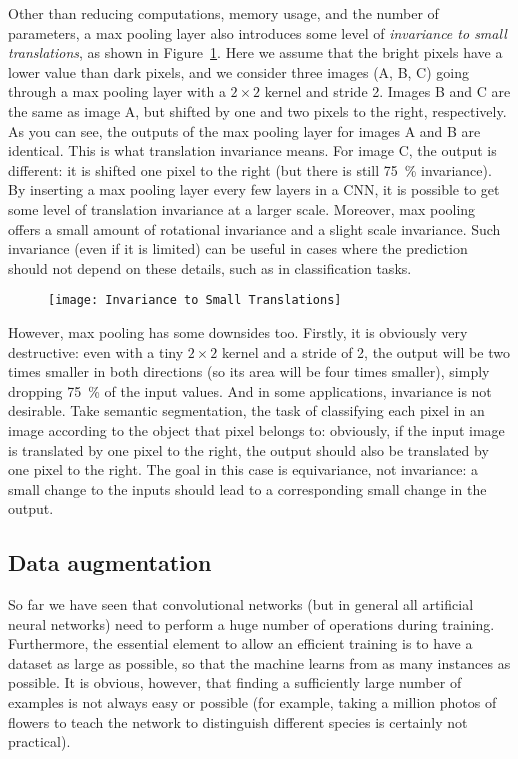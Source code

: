 Other than reducing computations, memory usage, and the number of parameters, a max pooling layer also introduces some level of \emph{invariance to small translations}, as shown in Figure~\ref{Invariance_to_Small_Translations}. Here we assume that the bright pixels have a lower value than dark pixels, and we consider three images (A, B, C) going through a max pooling layer with a $2\times2$ kernel and stride 2. Images B and C are the same as image A, but shifted by one and two pixels to the right, respectively. As you can see, the outputs of the max pooling layer for images A and B are identical. This is what translation invariance means. For image C, the output is different: it is shifted one pixel to the right (but there is still \SI{75}{\percent} invariance). By inserting a max pooling layer every few layers in a CNN, it is possible to get some level of translation invariance at a larger scale. Moreover, max pooling offers a small amount of rotational invariance and a slight scale invariance. Such invariance (even if it is limited) can be useful in cases where the prediction should not depend on these details, such as in classification tasks.
\begin{figure}[!ht]
\centering
\texttt{[image: Invariance to Small Translations]}
\caption{}\label{Invariance_to_Small_Translations}
\end{figure}

However, max pooling has some downsides too. Firstly, it is obviously very destructive: even with a tiny $2\times2$ kernel and a stride of 2, the output will be two times smaller in both directions (so its area will be four times smaller), simply dropping \SI{75}{\percent} of the input values. And in some applications, invariance is not desirable. Take semantic segmentation, the task of classifying each pixel in an image according to the object that pixel belongs to: obviously, if the input image is translated by one pixel to the right, the output should also be translated by one pixel to the right. The goal in this case is equivariance, not invariance: a small change to the inputs should lead to a corresponding small change in the output.
\subsection{Data augmentation}
So far we have seen that convolutional networks (but in general all artificial neural networks) need to perform a huge number of operations during training. Furthermore, the essential element to allow an efficient training is to have a dataset as large as possible, so that the machine learns from as many instances as possible. It is obvious, however, that finding a sufficiently large number of examples is not always easy or possible (for example, taking a million photos of flowers to teach the network to distinguish different species is certainly not practical).

